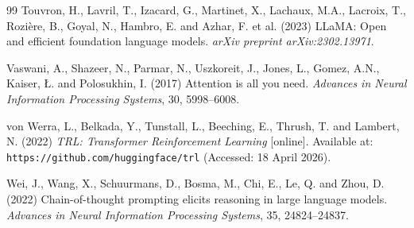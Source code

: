 \documentclass[12pt, oneside]{report}
\begin{document}
\begin{thebibliography}{99}
Touvron, H., Lavril, T., Izacard, G., Martinet, X., Lachaux, M.A., Lacroix, T., Rozi\`{e}re, B., Goyal, N., Hambro, E. and Azhar, F. et al. (2023)
LLaMA: Open and efficient foundation language models.
\textit{arXiv preprint arXiv:2302.13971}.

Vaswani, A., Shazeer, N., Parmar, N., Uszkoreit, J., Jones, L., Gomez, A.N., Kaiser, {\L}. and Polosukhin, I. (2017)
Attention is all you need.
\textit{Advances in Neural Information Processing Systems}, 30, 5998--6008.

von Werra, L., Belkada, Y., Tunstall, L., Beeching, E., Thrush, T. and Lambert, N. (2022)
\textit{TRL: Transformer Reinforcement Learning} [online].
Available at: \texttt{https://github.com/huggingface/trl} (Accessed: 18 April 2026).

Wei, J., Wang, X., Schuurmans, D., Bosma, M., Chi, E., Le, Q. and Zhou, D. (2022)
Chain-of-thought prompting elicits reasoning in large language models.
\textit{Advances in Neural Information Processing Systems}, 35, 24824--24837.

\end{thebibliography}

\appendix





\clearpage
\thispagestyle{empty}
\newpage
\end{document}
